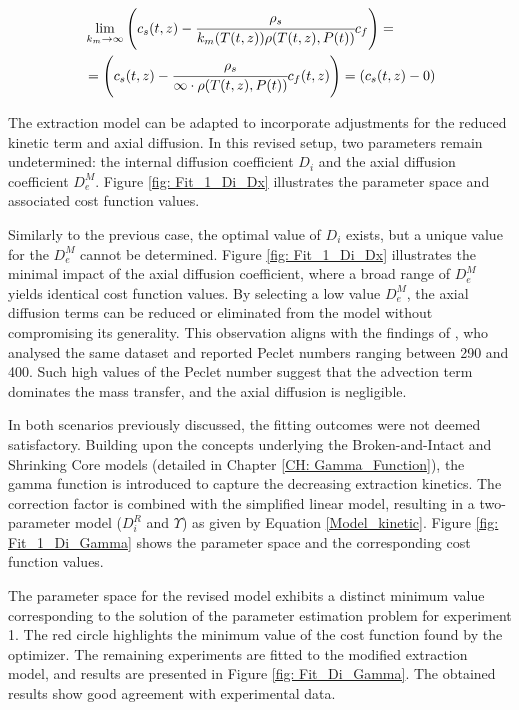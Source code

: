 \documentclass[../Supercritical_fluid_extraction_of_essential_oil_from_chamomile.tex]{subfiles}
\begin{document}
	{\footnotesize
		\begin{equation*}
			\begin{split}
				&\lim_{k_m \rightarrow \infty} \left({\color{black}{\color{black} c_s} }(t,z)  - \cfrac{{\color{black}\rho_s}}{{\color{black}k_m}(T(t,z)){\color{black}\rho}(T(t,z),{\color{black}P}(t))}  c_f \right)  = \\
				&= \left({\color{black}{\color{black} c_s} }(t,z)  - \cfrac{\rho_s}{\infty \cdot \rho(T(t,z),P(t))}  {c_f}(t,z) \right) = \left(c_s(t,z) - 0 \right)
			\end{split}
	\end{equation*} }
	
	The extraction model can be adapted to incorporate adjustments for the reduced kinetic term and axial diffusion. In this revised setup, two parameters remain undetermined: the internal diffusion coefficient $D_i$ and the axial diffusion coefficient $D_e^M$. Figure \ref{fig: Fit_1_Di_Dx} illustrates the parameter space and associated cost function values.
	
	Similarly to the previous case, the optimal value of $D_i$ exists, but a unique value for the $D_e^M$ cannot be determined. Figure \ref{fig: Fit_1_Di_Dx} illustrates the minimal impact of the axial diffusion coefficient, where a broad range of $D_e^M$ yields identical cost function values. By selecting a low value $D_e^M$, the axial diffusion terms can be reduced or eliminated from the model without compromising its generality. This observation aligns with the findings of \citet{Rahimi2011}, who analysed the same dataset and reported Peclet numbers ranging between 290 and 400. Such high values of the Peclet number suggest that the advection term dominates the mass transfer, and the axial diffusion is negligible.
	
	In both scenarios previously discussed, the fitting outcomes were not deemed satisfactory. Building upon the concepts underlying the Broken-and-Intact and Shrinking Core models (detailed in Chapter \ref{CH: Gamma_Function}), the gamma function is introduced to capture the decreasing extraction kinetics. The correction factor is combined with the simplified linear model, resulting in a two-parameter model ($D_i^R$ and $\Upsilon$) as given by Equation \ref{Model_kinetic}. Figure \ref{fig: Fit_1_Di_Gamma} shows the parameter space and the corresponding cost function values.

	The parameter space for the revised model exhibits a distinct minimum value corresponding to the solution of the parameter estimation problem for experiment 1. The red circle highlights the minimum value of the cost function found by the optimizer. The remaining experiments are fitted to the modified extraction model, and results are presented in Figure \ref{fig: Fit_Di_Gamma}. The obtained results show good agreement with experimental data. 
			
\end{document}
